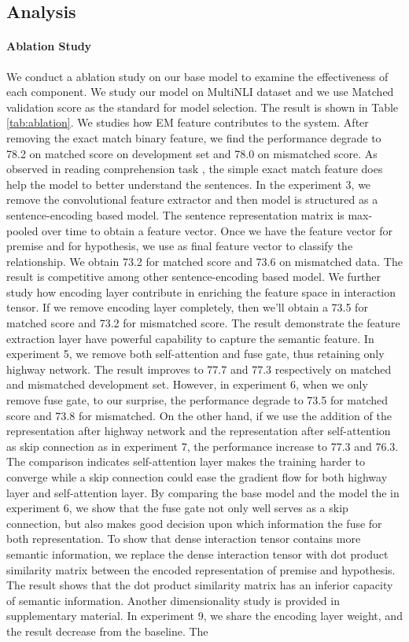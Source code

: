 \documentclass{article} \usepackage{iclr2018_conference,times}
\begin{document}
\subsection{Analysis}


\paragraph{Ablation Study}
We conduct a ablation study on our base model to examine the effectiveness of each component. We study our model on MultiNLI dataset and we use Matched validation score as the standard for model selection. The result is shown in Table \ref{tab:ablation}. 
We studies how EM feature contributes to the system. After removing the exact match binary feature, we find the performance degrade to 78.2 on matched score on development set and 78.0 on mismatched score. As observed in reading comprehension task \cite{document_reader_2017arXiv170400051C}, the simple exact match feature does help the model to better understand the sentences. In the experiment 3, we remove the convolutional feature extractor and then model is structured as a sentence-encoding based model. The sentence representation matrix is max-pooled over time to obtain a feature vector. Once we have the feature vector  for premise and  for hypothesis, we use  as final feature vector to classify the relationship. We obtain 73.2 for matched score and 73.6 on mismatched data. The result is competitive among other sentence-encoding based model. We further study how encoding layer contribute in enriching the feature space in interaction tensor. If we remove encoding layer completely, then we'll obtain a 73.5 for matched score and 73.2 for mismatched score. The result demonstrate the feature extraction layer have powerful capability to capture the semantic feature. In experiment 5, we remove both self-attention and fuse gate, thus retaining only highway network. The result improves to 77.7 and 77.3 respectively on matched and mismatched development set. However, in experiment 6, when we only remove fuse gate, to our surprise, the performance degrade to 73.5 for matched score and 73.8 for mismatched. On the other hand, if we use the addition of the representation after highway network and the representation after self-attention as skip connection as in experiment 7, the performance increase to 77.3 and 76.3. The comparison indicates self-attention layer makes the training harder to converge while a skip connection could ease the gradient flow for both highway layer and self-attention layer. By comparing the base model and the model the in experiment 6, we show that the fuse gate not only well serves as a skip connection, but also makes good decision upon which information the fuse for both representation. To show that dense interaction tensor contains more semantic information, we replace the dense interaction tensor with dot product similarity matrix between the encoded representation of premise and hypothesis. The result shows that the dot product similarity matrix has an inferior capacity of semantic information. Another dimensionality study is provided in supplementary material. In experiment 9, we share the encoding layer weight, and the result decrease from the baseline. The 
\end{document}
